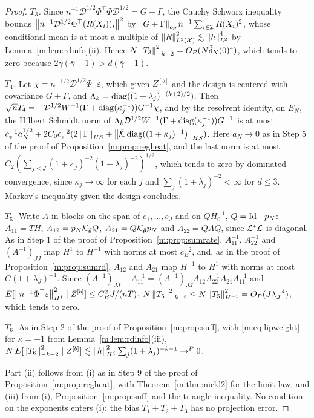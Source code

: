 \begin{proof}
\emph{$T_3$.} Since $n^{-1}\mathcal D^{1/2}\Phi^\top\Phi\mathcal D^{1/2}=G+\Gamma$, the Cauchy Schwarz inequality bounds $\left\|n^{-1}\mathcal D^{1/2}\Phi^\top(R(X_i))_i\right\|^2$ by $\left\|G+\Gamma\right\|_{op}n^{-1}\sum_{i\in\mathcal I}R(X_i)^2$, whose conditional mean is at most a multiple of $\left\|R\right\|^2_{L^2(\mathcal X)}\lesssim\left\|h\right\|^4_{L^2}$ by Lemma~\ref{m:lem:rdinfo}(ii). Hence $N\left\|T_3\right\|^2_{-k-2}=O_P(N\tilde\delta_N(0)^4)$, which tends to zero because $2\gamma(\bar\gamma-1)>d(\bar\gamma+1)$.

\emph{$T_4$.} Let $\chi=n^{-1/2}\mathcal D^{1/2}\Phi^\top\varepsilon$, which given $Z^{[b]}$ and the design is centered with covariance $G+\Gamma$, and $\Lambda_k=\operatorname{diag}((1+\lambda_j)^{-(k+2)/2})$. Then $\sqrt nT_4=-\mathcal D^{1/2}W^{-1}(\Gamma+\operatorname{diag}(\kappa_j^{-1}))G^{-1}\chi$, and by the resolvent identity, on $E_N$, the Hilbert Schmidt norm of $\Lambda_k\mathcal D^{1/2}W^{-1}(\Gamma+\operatorname{diag}(\kappa_j^{-1}))G^{-1}$ is at most $c_*^{-1}a_N^{1/2}+2C_0c_*^{-2}(2\left\|\Gamma\right\|_{HS}+\left\|\tilde{\mathcal{K}}\operatorname{diag}((1+\kappa_j)^{-1})\right\|_{HS})$. Here $a_N\to0$ as in Step 5 of the proof of Proposition~\ref{m:prop:regheat}, and the last norm is at most $C_2(\sum_{j\le J}(1+\kappa_j)^{-2}(1+\lambda_j)^{-2})^{1/2}$, which tends to zero by dominated convergence, since $\kappa_j\to\infty$ for each $j$ and $\sum_j(1+\lambda_j)^{-2}<\infty$ for $d\le3$. Markov's inequality given the design concludes.

\emph{$T_5$.} Write $A$ in blocks on the span of $e_1,\dots,e_J$ and on $QH^{-1}_0$, $Q=\operatorname{Id}-p_N$: $A_{11}=TH$, $A_{12}=p_N\mathcal{K}_{\bar\theta}Q$, $A_{21}=Q\mathcal{K}_{\bar\theta}p_N$ and $A_{22}=QAQ$, since $\mathcal{L}^*\mathcal{L}$ is diagonal. As in Step 1 of the proof of Proposition~\ref{m:prop:sumrate}, $A_{11}^{-1}$, $A_{22}^{-1}$ and $(A^{-1})_{JJ}$ map $H^1$ to $H^{-1}$ with norms at most $c_B^{-2}$, and, as in the proof of Proposition~\ref{m:prop:sumrd}, $A_{12}$ and $A_{21}$ map $H^{-1}$ to $H^1$ with norms at most $C(1+\lambda_J)^{-1}$. Since $(A^{-1})_{JJ}-A_{11}^{-1}=(A^{-1})_{JJ}A_{12}A_{22}^{-1}A_{21}A_{11}^{-1}$ and $E[\left\|n^{-1}\Phi^\top\varepsilon\right\|^2_{H^1}\mid Z^{[b]}]\le C_B^2J/(nT)$, $N\left\|T_5\right\|^2_{-k-2}\le N\left\|T_5\right\|^2_{H^{-1}}=O_P(J\lambda_J^{-4})$, which tends to zero.

\emph{$T_6$.} As in Step 2 of the proof of Proposition~\ref{m:prop:suff}, with \eqref{m:eq:lipweight} for $\kappa=-1$ from Lemma~\ref{m:lem:rdinfo}(iii), $N\,E[\left\|T_6\right\|^2_{-k-2}\mid Z^{[b]}]\lesssim\left\|h\right\|^2_{H^\zeta}\sum_j(1+\lambda_j)^{-k-1}\to^P0$.

Part (ii) follows from (i) as in Step 9 of the proof of Proposition~\ref{m:prop:regheat}, with Theorem~\ref{m:thm:nickl2} for the limit law, and (iii) from (i), Proposition~\ref{m:prop:suff} and the triangle inequality. No condition on the exponents enters (i): the bias $T_1+T_2+T_3$ has no projection error.
\end{proof}

